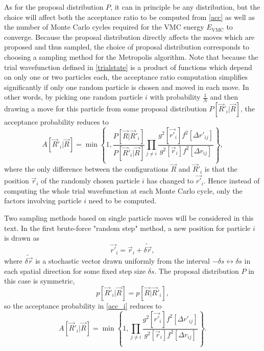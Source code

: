 \documentclass[a4paper,8pt]{article}
\begin{document}
\begin{multicols}{2}
As for the proposal distribution $P$, it can in principle be any distribution, but the choice will affect both the acceptance ratio to be computed from \eqref{acc} as well as the number of Monte Carlo cycles required for the VMC energy $E_\text{VMC}$ to converge. Because the proposal distribution directly affects the moves which are proposed and thus sampled, the choice of proposal distribution corresponds to choosing a sampling method for the Metropolis algorithm. Note that because the trial wavefunction defined in \eqref{trialstate} is a product of functions which depend on only one or two particles each, the acceptance ratio computation simplifies significantly if only one random particle is chosen and moved in each move. In other words, by picking one random particle $i$ with probability $\frac{1}{N}$ and then drawing a move for this particle from some proposal distribution $P[\vec{R}'_i|\vec{R}]$, the acceptance probability reduces to
\begin{equation}
A[\vec{R}'_i|\vec{R}] = \min\left\{1,\frac{P[\vec{R}|\vec{R}'_i]}{P[\vec{R}'_i|\vec{R}]}\prod\limits_{j \neq i} \frac{g^2[\vec{r'}_i]f^2[\Delta r'_{ij}]}{g^2[\vec{r}_i]f^2[\Delta r_{ij}]}\right\}, \label{acc_i}
\end{equation}
where the only difference between the configurations $\vec{R}$ and $\vec{R}'_i$ is that the position $\vec{r}_i$ of the randomly chosen particle $i$ has changed to $\vec{r'}_i$.  Hence instead of computing the whole trial wavefunction at each Monte Carlo cycle, only the factors involving particle $i$ need to be computed.

Two sampling methods based on single particle moves will be considered in this text. In the first brute-force "random step" method, a new position for particle $i$ is drawn as
\begin{equation}
\vec{r'}_i = \vec{r}_i+\widetilde{\delta\vec{r}}, \label{propRS}
\end{equation}
where $\widetilde{\delta\vec{r}}$ is a stochastic vector drawn uniformly from the interval $-\delta s \leftrightarrow \delta s$ in each spatial direction for some fixed step size $\delta s$. The proposal distribution $P$ in this case is symmetric,
\begin{equation}
p[\vec{R}'_i|\vec{R}] = p[\vec{R}|\vec{R}'_i], \nonumber
\end{equation}
so the acceptance probability in \eqref{acc_i} reduces to
\begin{equation}
A[\vec{R}'_i|\vec{R}] = \min\left\{1,\prod\limits_{j \neq i} \frac{g^2[\vec{r'}_i]f^2[\Delta r'_{ij}]}{g^2[\vec{r}_i]f^2[\Delta r_{ij}]}\right\}. \label{accRS}
\end{equation}


\end{multicols}
\end{document}
